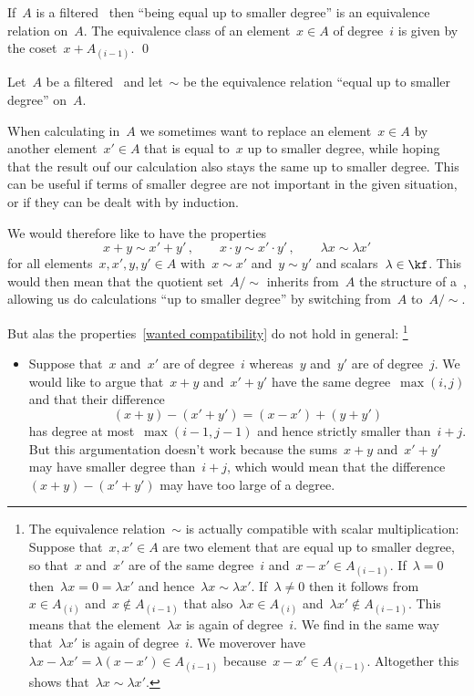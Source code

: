 \begin{corollary}
  If~$A$ is a filtered~{\algebra{$\kf$}} then \enquote{being equal up to smaller degree} is an equivalence relation on~$A$.
  The equivalence class of an element~$x \in A$ of degree~$i$ is given by the coset~$x + A_{(i-1)}$.
  \qed
\end{corollary}


\begin{remark}
  Let~$A$ be a filtered~{\algebra{$\kf$}} and let~$\sim$ be the equivalence relation \enquote{equal up to smaller degree} on~$A$.
  
  When calculating in~$A$ we sometimes want to replace an element~$x \in A$ by another element~$x' \in A$ that is equal to~$x$ up to smaller degree, while hoping that the result ouf our calculation also stays the same up to smaller degree.
  This can be useful if terms of smaller degree are not important in the given situation, or if they can be dealt with by induction.
  
  We would therefore like to have the properties
  \begin{equation}
    \label{wanted compatibility}
    x + y
    \sim
    x' + y' \,,
    \qquad
    x \cdot y
    \sim
    x' \cdot y' \,,
    \qquad
    \lambda x \sim \lambda x'
  \end{equation}
  for all elements~$x, x', y, y' \in A$ with~$x \sim x'$ and~$y \sim y'$ and scalars~$\lambda \in \kf$.
  This would then mean that the quotient set~$A/{\sim}$ inherits from~$A$ the structure of a~{\algebra{$\kf$}}, allowing us do calculations \enquote{up to smaller degree} by switching from~$A$ to~$A/{\sim}$.
  
  But alas the properties~\eqref{wanted compatibility} do not hold in general:%
  \footnote{The equivalence relation~$\sim$ is actually compatible with scalar multiplication:
  Suppose that~$x, x' \in A$ are two element that are equal up to smaller degree, so that~$x$ and~$x'$ are of the same degree~$i$ and~$x - x' \in A_{(i-1)}$.
  If~$\lambda = 0$ then~$\lambda x = 0 = \lambda x'$ and hence~$\lambda x \sim \lambda x'$.
  If~$\lambda \neq 0$ then it follows from~$x \in A_{(i)}$ and~$x \notin A_{(i-1)}$ that also~$\lambda x \in A_{(i)}$ and~$\lambda x' \notin A_{(i-1)}$.
  This means that the element~$\lambda x$ is again of degree~$i$.
  We find in the same way that~$\lambda x'$ is again of degree~$i$.
  We moverover have~$\lambda x - \lambda x' = \lambda (x-x') \in A_{(i-1)}$ because~$x - x' \in A_{(i-1)}$.
  Altogether this shows that~$\lambda x \sim \lambda x'$.}
  \begin{itemize}
    \item
      Suppose that~$x$ and~$x'$ are of degree~$i$ whereas~$y$ and~$y'$ are of degree~$j$.
      We would like to argue that~$x + y$ and~$x' + y'$ have the same degree~$\max(i,j)$ and that their difference
      \[
        (x + y) - (x' + y')
        =
        (x - x') + (y + y')
      \]
      has degree at most~$\max(i-1,j-1)$ and hence strictly smaller than~$i+j$.
      But this argumentation doesn’t work because the sums~$x+y$ and~$x'+y'$ may have smaller degree than~$i+j$, which would mean that the difference~$(x + y) - (x' + y')$ may have too large of a degree.
      

\end{itemize}
\end{remark}

